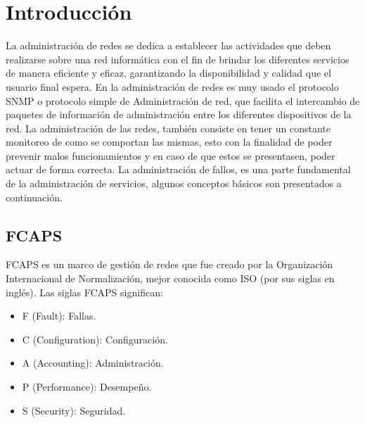 \chapter{Introducción}
\noindent
La administración de redes se dedica a establecer las actividades que deben realizarse sobre una red informática con el fin de brindar los diferentes servicios de manera eficiente y eficaz, garantizando la disponibilidad y calidad que el usuario final espera. En la administración de redes es muy usado el protocolo SNMP o protocolo simple de Administración de red, que facilita el intercambio de paquetes de información de administración entre los diferentes dispositivos de la red. La administración de las redes, también consiste en tener un constante monitoreo de como se comportan las mismas, esto con la finalidad de poder prevenir malos funcionamientos y en caso de que estos se presentasen, poder actuar de forma correcta. La administración de fallos, es una parte fundamental de la administración de servicios, algunos conceptos básicos son presentados a continuación.

\section{FCAPS}
FCAPS es un marco de gestión de redes que fue creado por la Organización Internacional de Normalización, mejor conocida como  ISO (por sus siglas en inglés).
\newline
Las siglas FCAPS significan:
\begin{itemize}
    \item F (Fault): Fallas.
    \item C (Configuration): Configuración.
    \item A (Accounting): Administración.
    \item P (Performance): Desempeño.
    \item S (Security): Seguridad.
\end{itemize}

